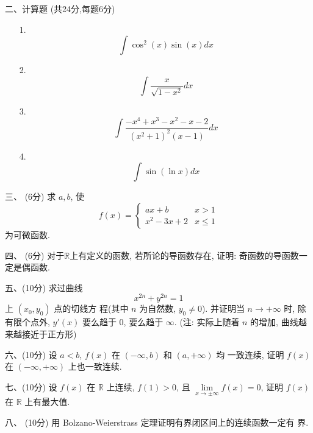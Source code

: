 \documentclass[zihao=-4,twoside]{ctexart} %
\newcommand{\Lim}{\lim\limits}
\begin{document}
\textsf{二、计算题 (共24分,每题6分)}
    \begin{enumerate}
    \item [1.] $$\int \cos^2(x)\sin(x)dx$$ \vspace{2.5in}
    \item [2.] $$\int \frac x{\sqrt{1-x^2}}dx$$ \vspace{2.5in}
    \item [3.] $$\int \frac {-x^4+x^3-x^2-x-2}{(x^2+1)^2(x-1)}dx$$ \vspace{4in}
    \item [4.] $$\int \sin(\ln x)dx$$\vspace{1.5in}
    \end{enumerate}

\newpage

\textsf{三、 (6分)} 求 $a,b$, 使
    $$f(x)=
    \begin{cases}
      ax+b & x>1\\
      x^2-3x+2 & x\le 1
    \end{cases}
    $$
    为可微函数.
    \vspace{3in}

\textsf{四、 (6分)} 对于$\mathbb{R}$上有定义的函数, 若所论的导函数存在, 证明:
    奇函数的导函数一定是偶函数.  \vspace{2in} \newpage

\textsf{五、(10分)} 求过曲线 $$x^{2n}+y^{2n}=1$$ 上 $(x_0,y_0)$ 点的切线方
    程(其中 $n$ 为自然数, $y_0\neq0$). 并证明当 $n\to+\infty$ 时, 除有限个点外,
    $y'(x)$ 要么趋于 $0$, 要么趋于 $\infty$. (注: 实际上随着 $n$ 的增加, 曲线越
    来越接近于正方形)  \vspace{3in}

\textsf{六、(10分)} 设 $a<b$, $f(x)$ 在 $(-\infty,b)$ 和 $(a,+\infty)$ 均
    一致连续, 证明 $f(x)$ 在 $(-\infty,+\infty)$ 上也一致连续.
    \vspace{2in} \newpage

\textsf{七、(10分)} 设 $f(x)$ 在 $\mathbb{R}$ 上连续, $f(1)>0$, 且
    $\Lim_{x\to\pm\infty}f(x)=0$, 证明 $f(x)$ 在 $\mathbb{R}$ 上有最大值.
    \vspace{3in}

\textsf{八、 (10分)} 用 Bolzano-Weierstrass 定理证明有界闭区间上的连续函数一定有
    界.\vspace{2in}
    
\end{document}
